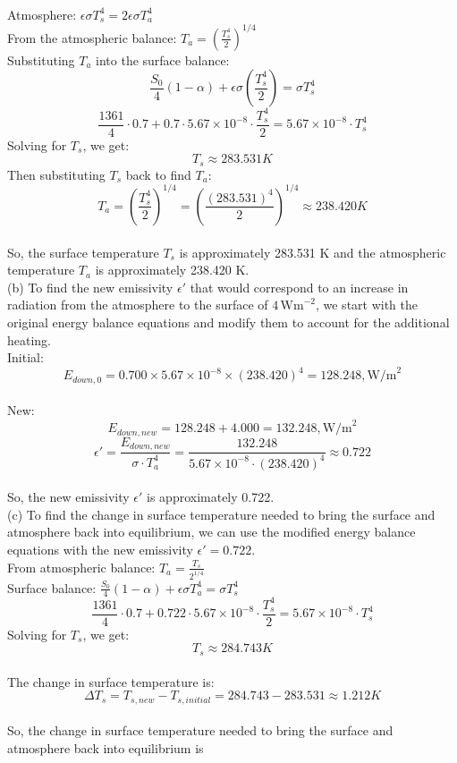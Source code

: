 \documentclass[letterpaper, 11pt]{article}
\newcommand{\1}{\mathds{1}}	%
\theoremstyle{definition}
\begin{document}
\\Atmosphere: $\epsilon\sigma T_s^4 = 2\epsilon\sigma T_a^4$
\\From the atmospheric balance: $T_a = \left( \frac{T_s^4}{2} \right)^{1/4}$
\\Substituting $T_a$ into the surface balance:
\[\frac{S_0}{4}(1-\alpha) + \epsilon\sigma \left( \frac{T_s^4}{2} \right) = \sigma T_s^4\]
\[\frac{1361}{4}\cdot 0.7 + 0.7 \cdot 5.67 \times 10^{-8} \cdot \frac{T_s^4}{2} = 5.67 \times 10^{-8} \cdot T_s^4\]
Solving for $T_s$, we get:
\[T_s \approx 283.531 K\]
Then substituting $T_s$ back to find $T_a$:
\[T_a = \left( \frac{T_s^4}{2} \right)^{1/4} = \left( \frac{(283.531)^4}{2} \right)^{1/4} \approx 238.420 K\]
\\
So, the surface temperature $T_s$ is approximately 283.531 K and the atmospheric temperature $T_a$ is approximately 238.420 K.
\\
(b) To find the new emissivity $\epsilon'$ that would correspond to an increase in radiation from the atmosphere to the surface of $4\,\text{Wm}^{-2}$, we start with the original energy balance equations and modify them to account for the additional heating.
\\Initial: \[E_{down,0} = 0.700 \times 5.67 \times 10^{-8} \times (238.420)^4 = 128.248,\text{W/m}^2\]
\\New: \[E_{down,new} = 128.248 + 4.000 = 132.248,\text{W/m}^2\]
\[\epsilon' = \frac{E_{down,new}}{\sigma\cdot T_a^4} = \frac{132.248}{5.67 \times 10^{-8} \cdot (238.420)^4} \approx 0.722\]
\\So, the new emissivity $\epsilon'$ is approximately 0.722.
\\
(c) To find the change in surface temperature needed to bring the surface and atmosphere back into equilibrium, we can use the modified energy balance equations with the new emissivity $\epsilon' = 0.722$.
\\From atmospheric balance: $T_a = \frac{T_s}{2^{1/4}}$
\\Surface balance: $\frac{S_0}{4}(1-\alpha) + \epsilon\sigma T_a^4 = \sigma T_s^4$
\[\frac{1361}{4}\cdot 0.7 + 0.722 \cdot 5.67 \times 10^{-8} \cdot \frac{T_s^4}{2} = 5.67 \times 10^{-8} \cdot T_s^4\]
Solving for $T_s$, we get:
\[T_s \approx 284.743K\]
\\The change in surface temperature is:
\[\Delta T_s = T_{s,new} - T_{s,initial} = 284.743 - 283.531 \approx 1.212 K\]
\\So, the change in surface temperature needed to bring the surface and atmosphere back into equilibrium is
\end{document}
